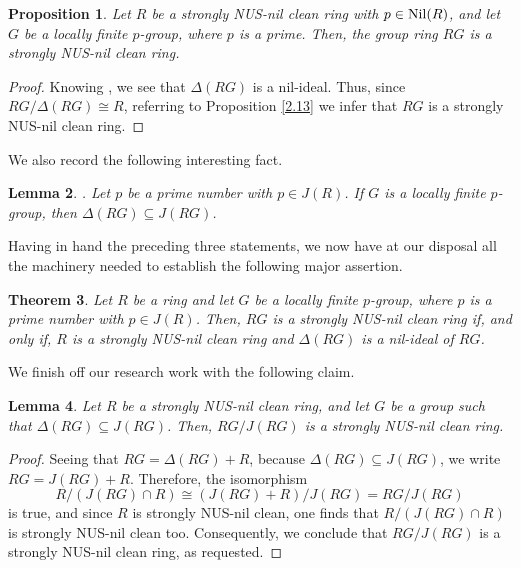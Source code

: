 \documentclass[12pt]{amsart}
\newtheorem{theorem}{Theorem}[section]
\newtheorem{proposition}[theorem]{Proposition}
\newtheorem{lemma}[theorem]{Lemma}
\theoremstyle{definition}
\begin{document}
\begin{proposition}\label{3.2}
Let $R$ be a strongly NUS-nil clean ring with $p \in {\rm Nil}(R)$, and let $G$ be a locally finite $p$-group, where $p$ is a prime. Then, the group ring $RG$ is a strongly NUS-nil clean ring.
\end{proposition}

\begin{proof}
Knowing \cite[Proposition 16]{25}, we see that $\Delta(RG)$ is a nil-ideal. Thus, since $RG/\Delta(RG) \cong R$, referring to Proposition \ref{2.13} we infer that $RG$ is a strongly NUS-nil clean ring.
\end{proof}

We also record the following interesting fact.

\begin{lemma}\label{3.7} \cite[Lemma $2$]{27}.
Let $p$ be a prime number with $p\in J(R)$. If $G$ is a locally finite $p$-group, then $\Delta(RG) \subseteq J(RG)$.
\end{lemma}

Having in hand the preceding three statements, we now have at our disposal all the machinery needed to establish the following major assertion.

\begin{theorem}\label{3.8}
Let $R$ be a ring and let $G$ be a locally finite $p$-group, where $p$ is a prime number with $p\in J(R)$. Then, $RG$ is a strongly NUS-nil clean ring if, and only if, $R$ is a strongly NUS-nil clean ring and $\Delta(RG)$ is a nil-ideal of $RG$.
\end{theorem}

We finish off our research work with the following claim.

\begin{lemma}
Let $R$ be a strongly NUS-nil clean ring, and let $G$ be a group such that $\Delta(RG) \subseteq J(RG)$. Then, $RG/J(RG)$ is a strongly NUS-nil clean ring.
\end{lemma}

\begin{proof}
Seeing that $RG = \Delta(RG) + R$, because $\Delta(RG) \subseteq J(RG)$, we write $RG = J(RG) + R$. Therefore, the isomorphism
$$R/(J(RG) \cap R) \cong (J(RG) + R)/J(RG) = RG/J(RG)$$
is true, and since $R$ is strongly NUS-nil clean, one finds that $R/(J(RG) \cap R)$ is strongly NUS-nil clean too. Consequently, we conclude that $RG/J(RG)$ is a strongly NUS-nil clean ring, as requested.
\end{proof}
\end{document}
